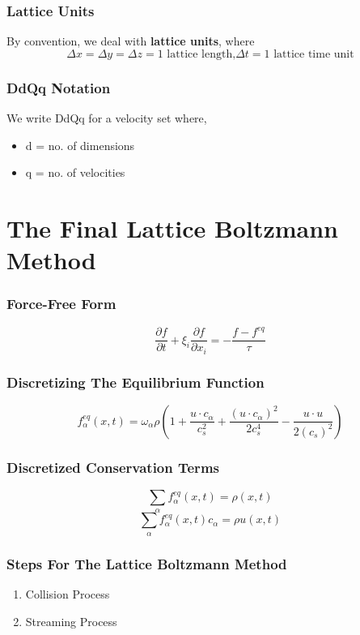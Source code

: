 \documentclass{beamer}
\begin{document}
\begin{frame}
	\frametitle{Lattice Units}
	By convention, we deal with \textbf{lattice units}, where
\[
	\Delta x = \Delta y = \Delta z = 1 \text{ lattice length,} \Delta t = \text{1 lattice time unit}
\]
\end{frame}
\begin{frame}
	\frametitle{DdQq Notation}
	We write DdQq for a velocity set where,
	\begin{itemize}
		\item d = no. of dimensions
		\item q = no. of velocities
	\end{itemize}
\end{frame}
\section{The Final Lattice Boltzmann Method}
\begin{frame}
	\frametitle{Force-Free Form}
\[
	\frac{\partial f}{\partial t} + \xi_i \frac{\partial f}{\partial x_i} = - \frac{f-f^{eq}}{\tau}
\]
\end{frame}
\begin{frame}
\frametitle{Discretizing The Equilibrium Function}
\[
	f^{eq}_\alpha(x,t) = \omega_\alpha\rho(1 + \frac{u \cdot c_\alpha}{c_s^{2}} + \frac{(u \cdot c_\alpha)^{2}}{2c_s^{4}} - \frac{u\cdot u}{2(c_s)^2})
\]
\end{frame}
\begin{frame}
	\frametitle{Discretized Conservation Terms}	
	\[\sum_\alpha f^{eq}_\alpha(x,t) = \rho(x,t)\]
\[\sum_\alpha f^{eq}_\alpha(x,t)c_\alpha = \rho u(x,t)\]
\end{frame}
\begin{frame}
	\frametitle{Steps For The Lattice Boltzmann Method}
	\begin{enumerate}
		\item Collision Process
		\item Streaming Process
	\end{enumerate}
\end{frame}
\end{document}
